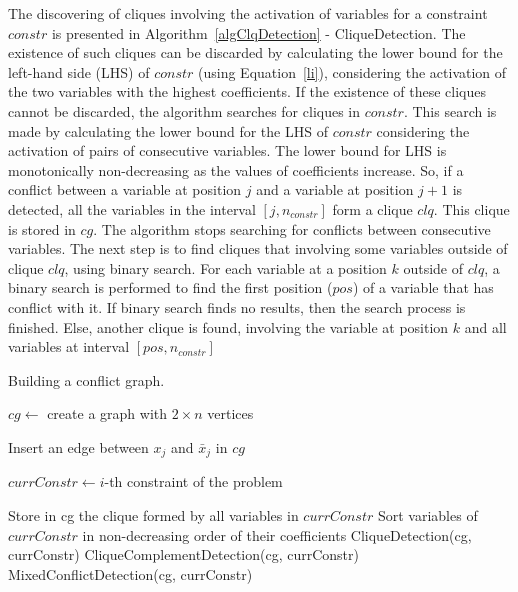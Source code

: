 \documentclass[preprint,12pt]{elsarticle}
\begin{document}
The discovering of cliques involving the activation of variables for a constraint $constr$ is presented in Algorithm~\ref{algClqDetection} - CliqueDetection. The existence of such cliques can be discarded by calculating the lower bound for the left-hand side (LHS) of $constr$ (using Equation~\ref{li}), considering the activation of the two variables with the highest coefficients. If the existence of these cliques cannot be discarded, the algorithm searches for cliques in $constr$. This search is made by calculating the lower bound for the LHS of $constr$ considering the activation of pairs of consecutive variables. The lower bound for LHS is monotonically non-decreasing as the values of coefficients increase. So, if a conflict between a variable at position $j$ and a variable at position $j+1$ is detected, all the variables in the interval $[j, n_{constr}]$ form a clique $clq$. This clique is stored in $cg$. The algorithm stops searching for conflicts between consecutive variables. The next step is to find cliques that involving some variables outside of clique $clq$, using binary search. For each variable at a position $k$ outside of $clq$, a binary search is performed to find the first position ($pos$) of a variable that has conflict with it. If binary search finds no results, then the search process is finished. Else, another clique is found, involving the variable at position $k$ and all variables at interval $[pos, n_{constr}]$


\begin{algorithm}
\caption{Building a conflict graph.} \label{algCGraph}

$cg \gets$ create a graph with $2 \times n$ vertices\;

{
	Insert an edge between $x_j$ and $\bar{x}_j$ in $cg$\;
}

{
	$currConstr \gets i$-th constraint of the problem\;
	
	{
		Store in cg the clique formed by all variables in $currConstr$\;
	}			
	Sort variables of $currConstr$ in non-decreasing order of their coefficients\;
	CliqueDetection(cg, currConstr)\;
	CliqueComplementDetection(cg, currConstr)\;
	MixedConflictDetection(cg, currConstr)\;
}
\end{algorithm}
\end{document}
